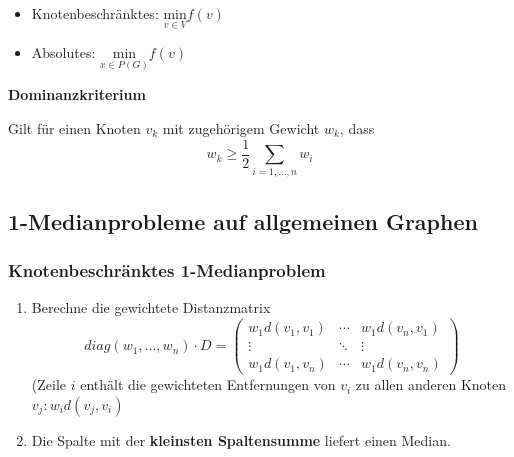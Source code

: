     \begin{itemize}
      \item Knotenbeschränktes: $\underset{v \in V}{\text{min}}f(v)$
      \item Absolutes: $\underset{x \in P(G)}{\text{min}}f(v)$
    \end{itemize}

    \par \textbf{Dominanzkriterium}
    \par Gilt für einen Knoten $v_k$ mit zugehörigem Gewicht $w_k$, dass
    \[
      w_k \geq \frac{1}{2}\sum_{i = 1, \dots, n}w_i
    \]

    \subsection{1-Medianprobleme auf allgemeinen Graphen} %
    \label{sub:1_medianprobleme_auf_allgemeinen_graphen}

      \subsubsection{Knotenbeschränktes 1-Medianproblem} %
      \label{ssub:knotenbeschränktes_1_medianproblem}

        \begin{enumerate}
          \item Berechne die gewichtete Distanzmatrix
                $$
                  diag(w_1, \dots, w_n) \cdot D = 
                  \begin{pmatrix}
                    w_1d(v_1, v_1) &  \cdots & w_1d(v_n, v_1) \\
                    \vdots  & \ddots & \vdots  \\
                    w_1d(v_1, v_n) & \cdots & w_1d(v_n, v_n)
                 \end{pmatrix}
                $$
                (Zeile $i$ enthält die gewichteten Entfernungen von $v_i$ zu allen anderen Knoten $v_j: w_id(v_j, v_i)$
          \item Die Spalte mit der \textbf{kleinsten Spaltensumme} liefert einen Median.
        \end{enumerate}

        \begin{exmp}
          
        \end{exmp}

